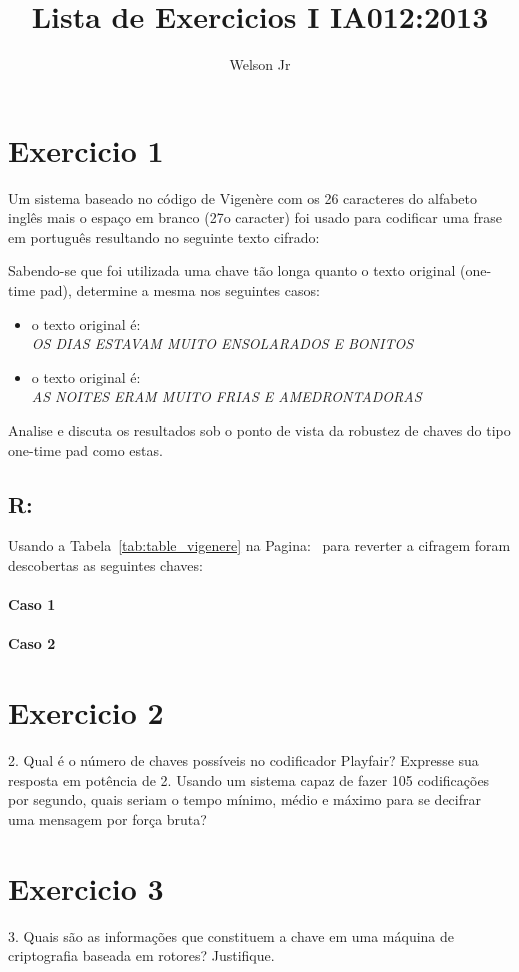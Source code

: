 \documentclass[10pt,a4paper]{article}
\author{Welson Jr}
\title{Lista de Exercicios I IA012:2013}
\begin{document}
\maketitle
\section*{Exercicio 1}
Um sistema baseado no código de Vigenère com os 26 caracteres do alfabeto inglês mais o espaço em branco (27o caracter) foi usado para codificar uma frase em português resultando no seguinte texto cifrado:
\begin{center}
\end{center}
Sabendo-se que foi utilizada uma chave tão longa quanto o texto original (one-time pad), determine a mesma nos seguintes casos:
\begin{itemize}
\item o texto original é: \\ \emph{ OS DIAS ESTAVAM MUITO ENSOLARADOS E BONITOS }
\item o texto original é: \\ \emph{ AS NOITES ERAM MUITO FRIAS E AMEDRONTADORAS }
\end{itemize}
 Analise e discuta os resultados sob o ponto de vista da robustez de chaves do tipo one-time pad como estas.
\subsection*{R:}
Usando a Tabela~\ref{tab:table_vigenere} na Pagina:~\pageref{tab:table_vigenere} para reverter a cifragem foram descobertas as seguintes chaves:
\paragraph*{Caso 1}
\paragraph*{Caso 2}

\section*{Exercicio 2}
2. Qual é o número de chaves possíveis no codificador Playfair? Expresse sua resposta em potência de 2. Usando um sistema capaz de fazer 105 codificações por segundo, quais seriam o tempo mínimo, médio e máximo para se decifrar uma mensagem por força bruta?
\section*{Exercicio 3}
3. Quais são as informações que constituem a chave em uma máquina de criptografia baseada em rotores? Justifique.
\end{document}
